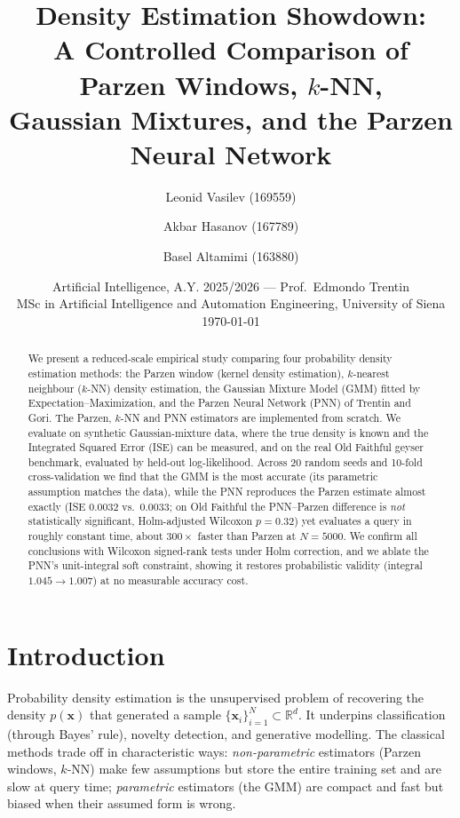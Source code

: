 \documentclass[11pt,a4paper]{article}
\title{\textbf{Density Estimation Showdown:\\
A Controlled Comparison of Parzen Windows, $k$-NN,\\
Gaussian Mixtures, and the Parzen Neural Network}}
\author{
Leonid Vasilev (169559) \and
Akbar Hasanov (167789) \and
Basel Altamimi (163880)
}
\date{
Artificial Intelligence, A.Y. 2025/2026 --- Prof.\ Edmondo Trentin\\
MSc in Artificial Intelligence and Automation Engineering, University of Siena\\[4pt]
\today
}
\begin{document}
\maketitle

\begin{abstract}
We present a reduced-scale empirical study comparing four probability density
estimation methods: the Parzen window (kernel density estimation), $k$-nearest
neighbour ($k$-NN) density estimation, the Gaussian Mixture Model (GMM) fitted
by Expectation--Maximization, and the Parzen Neural Network (PNN) of Trentin and
Gori. The Parzen, $k$-NN and PNN estimators are implemented from scratch. We
evaluate on synthetic Gaussian-mixture data, where the true density is known and
the Integrated Squared Error (ISE) can be measured, and on the real Old Faithful
geyser benchmark, evaluated by held-out log-likelihood. Across 20 random seeds
and 10-fold cross-validation we find that the GMM is the most accurate (its
parametric assumption matches the data), while the PNN reproduces the Parzen
estimate almost exactly (ISE $0.0032$ vs.\ $0.0033$; on Old Faithful the
PNN--Parzen difference is \emph{not} statistically significant, Holm-adjusted
Wilcoxon $p=0.32$) yet evaluates a query in roughly constant time, about
$300\times$ faster than Parzen at $N=5000$. We confirm all conclusions with
Wilcoxon signed-rank tests under Holm correction, and we ablate the PNN's
unit-integral soft constraint, showing it restores probabilistic validity
(integral $1.045\!\rightarrow\!1.007$) at no measurable accuracy cost.
\end{abstract}

\section{Introduction}
Probability density estimation is the unsupervised problem of recovering the
density $p(\mathbf{x})$ that generated a sample
$\{\mathbf{x}_i\}_{i=1}^N \subset \mathbb{R}^d$. It underpins classification
(through Bayes' rule), novelty detection, and generative modelling. The classical
methods trade off in characteristic ways: \emph{non-parametric} estimators
(Parzen windows, $k$-NN) make few assumptions but store the entire training set
and are slow at query time; \emph{parametric} estimators (the GMM) are compact
and fast but biased when their assumed form is wrong.
\end{document}
